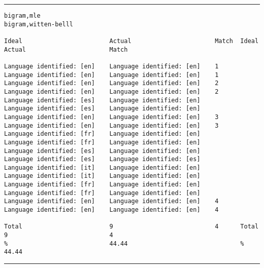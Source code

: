 \tiny
\hrule\vskip4pt
\begin{verbatim}
bigram,mle                                                       bigram,witten-belll

Ideal                        Actual                       Match  Ideal                        Actual                       Match

Language identified: [en]    Language identified: [en]    1      Language identified: [en]    Language identified: [en]    1
Language identified: [en]    Language identified: [en]    2      Language identified: [en]    Language identified: [en]    2
Language identified: [es]    Language identified: [en]           Language identified: [es]    Language identified: [en]
Language identified: [en]    Language identified: [en]    3      Language identified: [en]    Language identified: [en]    3
Language identified: [fr]    Language identified: [en]           Language identified: [fr]    Language identified: [en]
Language identified: [es]    Language identified: [en]           Language identified: [es]    Language identified: [es]
Language identified: [it]    Language identified: [en]           Language identified: [it]    Language identified: [en]
Language identified: [fr]    Language identified: [en]           Language identified: [fr]    Language identified: [en]
Language identified: [en]    Language identified: [en]    4      Language identified: [en]    Language identified: [en]    4

Total                        9                            4      Total                        9                            4
%                            44.44                               %                            44.44
\end{verbatim}
\vskip4pt\hrule

